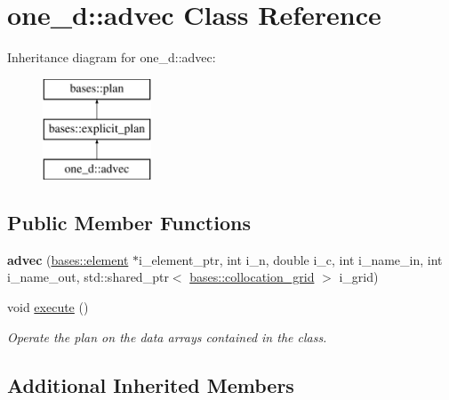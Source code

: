 \hypertarget{classone__d_1_1advec}{\section{one\-\_\-d\-:\-:advec Class Reference}
\label{classone__d_1_1advec}
}
Inheritance diagram for one\-\_\-d\-:\-:advec\-:\begin{figure}[H]
\begin{center}
\leavevmode
\includegraphics[height=3.000000cm]{classone__d_1_1advec}
\end{center}
\end{figure}
\subsection*{Public Member Functions}
\begin{DoxyCompactItemize}
\item 
\hypertarget{classone__d_1_1advec_a15229b440611b1f03ec254fa4c54d612}{{\bfseries advec} (\hyperlink{classbases_1_1element}{bases\-::element} $\ast$i\-\_\-element\-\_\-ptr, int i\-\_\-n, double i\-\_\-c, int i\-\_\-name\-\_\-in, int i\-\_\-name\-\_\-out, std\-::shared\-\_\-ptr$<$ \hyperlink{classbases_1_1collocation__grid}{bases\-::collocation\-\_\-grid} $>$ i\-\_\-grid)}\label{classone__d_1_1advec_a15229b440611b1f03ec254fa4c54d612}

\item 
void \hyperlink{classone__d_1_1advec_a1811538aec2a23cc27ef87fbce5dec8c}{execute} ()
\begin{DoxyCompactList}\small\item\em Operate the plan on the data arrays contained in the class. \end{DoxyCompactList}\end{DoxyCompactItemize}
\subsection*{Additional Inherited Members}


